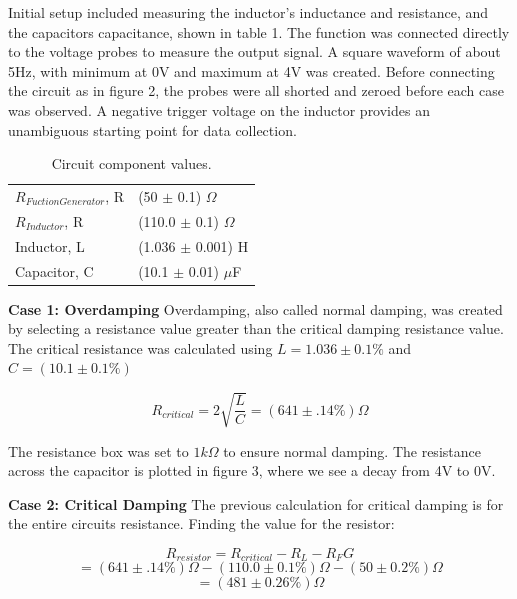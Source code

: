\documentclass[twocolumn, letterpaper, 10pt, twoside]{article}
\begin{document}
	\indent Initial setup included measuring the inductor's inductance and resistance, and the capacitors capacitance, shown in table 1. The function was connected directly to the voltage probes to measure the output signal. A square waveform of about 5Hz, with minimum at 0V and maximum at 4V was created. Before connecting the circuit as in figure 2, the probes were all shorted and zeroed before each case was observed. A negative trigger voltage on the inductor provides an unambiguous starting point for data collection.
	
	\begin{table} [H] 
		\centering
		\tabulinesep=1.5mm
		\begin{tabu} { | X[c] | X[c] | }
			\hline \centering
			$R_{Fuction Generator}$, R & (50 $\pm$ 0.1) $\Omega$ \\
			\centering
			$R_{Inductor}$, R & (110.0 $\pm$ 0.1) $\Omega$ \\
			\centering
			Inductor, L & (1.036 $\pm$ 0.001) H \\
			\centering
			Capacitor, C & (10.1 $\pm$ 0.01) $\mu$F \\
			\hline
		\end{tabu}
		\captionsetup{width=.8\linewidth}
		\vspace{-1mm}
		\caption{Circuit component values.}
	\end{table}
	
	\textbf{{Case 1:} Overdamping}
	Overdamping, also called normal damping, was created by selecting a resistance value greater than the critical damping resistance value. The critical resistance was calculated using $L = 1.036 \pm 0.1\% $ and $C = (10.1 \pm 0.1\%)$
	
	\begin{equation*}
	R_{critical} = 2 \sqrt{\frac{L}{C}} =(641 \pm .14\%) \Omega
	\end{equation*}
	
	The resistance box was set to $1k\Omega$ to ensure normal damping. The resistance across the capacitor is plotted in figure 3, where we see a decay from 4V to 0V.
	
	\textbf{{Case 2:} Critical Damping}
	The previous calculation for critical damping is for the entire circuits resistance. Finding the value for the resistor: 
	
	\begin{equation*}
	R_{resistor} = R_{critical} - R_L - R_FG 
	\end{equation*}
	\begin{equation*}
	= (641 \pm .14\%)\Omega - (110.0 \pm 0.1\%)\Omega - (50 \pm 0.2\%)\Omega 
	\end{equation*}
	\begin{equation*}
	= (481 \pm 0.26\%)\Omega
	\end{equation*}
	
\end{document}
